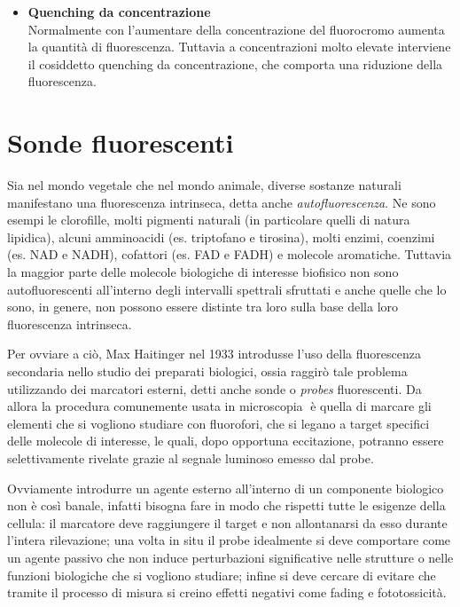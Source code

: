\begin{itemize}
\item \textbf{Quenching da concentrazione} \\
Normalmente con l'aumentare della concentrazione del fluorocromo aumenta la quantità di fluorescenza. 
Tuttavia a concentrazioni molto elevate interviene il cosiddetto quenching da concentrazione, che comporta una riduzione della fluorescenza.
\end{itemize} 


\section{Sonde fluorescenti}

Sia nel mondo vegetale che nel mondo animale, diverse sostanze naturali manifestano una fluorescenza intrinseca, detta anche \textit{autofluorescenza}.
Ne sono esempi le clorofille, molti pigmenti naturali (in particolare quelli di natura lipidica), alcuni amminoacidi (es. triptofano e tirosina), molti enzimi, coenzimi (es. NAD e NADH), cofattori (es. FAD e FADH) e molecole aromatiche. 
Tuttavia la maggior parte delle molecole biologiche di interesse biofisico non sono autofluorescenti all'interno degli intervalli spettrali sfruttati e anche quelle che lo sono, in genere, non possono essere distinte tra loro sulla base della loro fluorescenza intrinseca.

Per ovviare a ciò, Max Haitinger nel 1933 introdusse l'uso della fluorescenza secondaria nello studio dei preparati biologici, ossia raggirò tale problema utilizzando dei marcatori esterni, detti anche sonde o \textit{probes} fluorescenti. 
Da allora la procedura comunemente usata in microscopia è quella di marcare gli elementi che si vogliono studiare con fluorofori, che si legano a target specifici delle molecole di interesse, le quali, dopo opportuna eccitazione, potranno essere selettivamente rivelate grazie al segnale luminoso emesso dal probe. 

Ovviamente introdurre un agente esterno all'interno di un componente biologico non è così banale, infatti bisogna fare in modo che rispetti tutte le esigenze della cellula: il marcatore deve raggiungere il target e non allontanarsi da esso durante l'intera rilevazione; una volta in situ il probe idealmente si deve comportare come un agente passivo che non induce perturbazioni significative nelle strutture o nelle funzioni biologiche che si vogliono studiare; infine si deve cercare di evitare che tramite il processo di misura si creino effetti negativi come fading e fototossicità.

